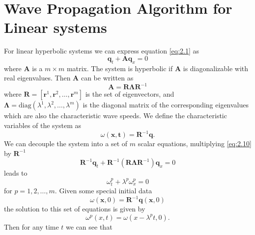 \documentclass[twoside]{bsu-ms}
\begin{document}
 \section{Wave Propagation Algorithm for Linear systems}\label{sec:2.2}
 For linear hyperbolic systems we can express equation \eqref{eq:2.1} as
 \begin{equation}\label{eq:2.9}
     \mathbf{q}_{t}+\mathbf{A}\mathbf{q}_{x}=0     
 \end{equation}
 where $\mathbf{A}$ is a $m\times m$ matrix. The system is hyperbolic if $\mathbf{A}$ is diagonalizable with real eigenvalues. Then $\mathbf{A}$ can be written as 
 \begin{equation}\label{eq:2.10}
     \mathbf{A}=\mathbf{R}\mathbf{\Lambda} \mathbf{R}^{-1}
 \end{equation}
 where $\mathbf{R}=[\mathbf{r}^{1},\mathbf{r}^{2},\dots,\mathbf{r}^{m}]$ is the set of eigenvectors, and $\mathbf{\Lambda}=\mbox{diag}(\lambda^{1},\lambda^{2},\dots,\lambda^{m})$ is the diagonal matrix of the corresponding eigenvalues which are also the characteristic wave speeds. We define the characteristic variables of the system as
 \begin{equation}\label{eq:2.11}
     \omega(\mathbf{x},\mathbf{t})=\mathbf{R}^{-1}\mathbf{q}.
 \end{equation}
 We can decouple the system into a set of $m$ scalar equations, multiplying \eqref{eq:2.10} by $\mathbf{R}^{-1}$ 
\begin{equation}\label{eq:2.12}
\mathbf{R}^{-1}\mathbf{q}_{t}+\mathbf{R}^{-1}\left(\mathbf{R}\mathbf{\Lambda} \mathbf{R}^{-1}\right)\mathbf{q}_{x}=0    
\end{equation}
leads to
\begin{equation}\label{eq:2.13}
    \omega^{p}_{t}+\lambda^{p}\omega^{p}_{x}=0
\end{equation}
for $p=1,2,\dots,m$. Given some special initial data 
\begin{equation}\label{eq:2.14}
    \omega(\mathbf{x},0)=\mathbf{R}^{-1}\mathbf{q}(\mathbf{x},0)
\end{equation}
the solution to this set of equations is given by 
\begin{equation}\label{eq:2.15}
    \omega^{p}(x,t)=\omega(x-\lambda^{p}t,0).
\end{equation}
Then for any time $t$ we can see that
\end{document}
